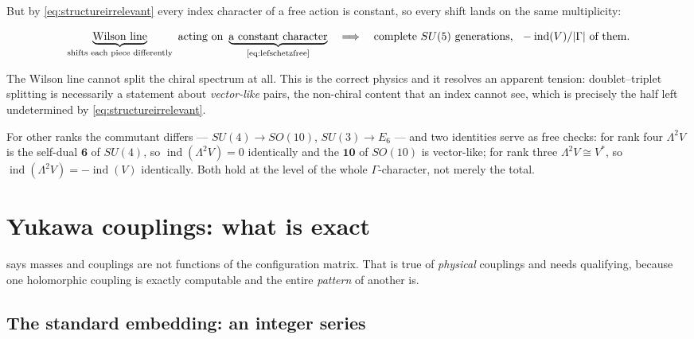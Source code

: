 \documentclass[11pt,a4paper]{article}
\theoremstyle{definition}
\begin{document}
But by \cref{eq:structureirrelevant} every index character of a free action is
constant, so every shift lands on the same multiplicity:
%
\begin{footnotesize}
\begin{equation}
\underbrace{\text{Wilson line}}_{\text{shifts each piece differently}}
\ \text{acting on} \
\underbrace{\text{a constant character}}_{\text{\cref{eq:lefschetzfree}}}
\quad\Longrightarrow\quad
\text{complete } SU(5) \ \text{generations, } \
-\operatorname{ind}(V)/|\Gamma| \ \text{of them.}
\label{eq:nosplit}
\end{equation}
\end{footnotesize}
%
The Wilson line cannot split the chiral spectrum at all. This is the correct
physics and it resolves an apparent tension: doublet--triplet splitting is
necessarily a statement about \emph{vector-like} pairs, the non-chiral content
that an index cannot see, which is precisely the half left undetermined by
\cref{eq:structureirrelevant}.

For other ranks the commutant differs --- $SU(4) \to SO(10)$, $SU(3) \to E_6$
--- and two identities serve as free checks: for rank four $\Lambda^2 V$ is the
self-dual $\mathbf{6}$ of $SU(4)$, so $\operatorname{ind}(\Lambda^2 V) = 0$
identically and the $\mathbf{10}$ of $SO(10)$ is vector-like; for rank three
$\Lambda^2 V \cong V^*$, so $\operatorname{ind}(\Lambda^2 V) =
-\operatorname{ind}(V)$ identically. Both hold at the level of the whole
$\Gamma$-character, not merely the total.

\section{Yukawa couplings: what is exact}
\label{sec:yukawa}

 says masses and couplings are not functions of the
configuration matrix. That is true of \emph{physical} couplings and needs
qualifying, because one holomorphic coupling is exactly computable and the
entire \emph{pattern} of another is.

\subsection{The standard embedding: an integer series}
\end{document}
